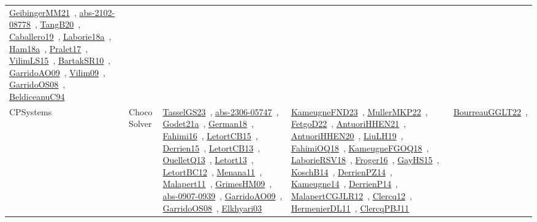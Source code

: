 {\begin{longtable}{lp{3cm}>{\raggedright\arraybackslash}p{6cm}>{\raggedright\arraybackslash}p{6cm}>{\raggedright\arraybackslash}p{8cm}}
\href{works/GeibingerMM21.pdf}{GeibingerMM21}~\cite{GeibingerMM21}, \href{works/abs-2102-08778.pdf}{abs-2102-08778}~\cite{abs-2102-08778}, \href{works/TangB20.pdf}{TangB20}~\cite{TangB20}, \href{works/Caballero19.pdf}{Caballero19}~\cite{Caballero19}, \href{works/Laborie18a.pdf}{Laborie18a}~\cite{Laborie18a}, \href{works/Ham18a.pdf}{Ham18a}~\cite{Ham18a}, \href{works/Pralet17.pdf}{Pralet17}~\cite{Pralet17}, \href{works/VilimLS15.pdf}{VilimLS15}~\cite{VilimLS15}, \href{works/BartakSR10.pdf}{BartakSR10}~\cite{BartakSR10}, \href{works/GarridoAO09.pdf}{GarridoAO09}~\cite{GarridoAO09}, \href{works/Vilim09.pdf}{Vilim09}~\cite{Vilim09}, \href{works/GarridoOS08.pdf}{GarridoOS08}~\cite{GarridoOS08}, \href{works/BeldiceanuC94.pdf}{BeldiceanuC94}~\cite{BeldiceanuC94}\\
CPSystems & Choco Solver & \href{works/TasselGS23.pdf}{TasselGS23}~\cite{TasselGS23}, \href{works/abs-2306-05747.pdf}{abs-2306-05747}~\cite{abs-2306-05747}, \href{works/Godet21a.pdf}{Godet21a}~\cite{Godet21a}, \href{works/German18.pdf}{German18}~\cite{German18}, \href{works/Fahimi16.pdf}{Fahimi16}~\cite{Fahimi16}, \href{works/LetortCB15.pdf}{LetortCB15}~\cite{LetortCB15}, \href{works/Derrien15.pdf}{Derrien15}~\cite{Derrien15}, \href{works/LetortCB13.pdf}{LetortCB13}~\cite{LetortCB13}, \href{works/OuelletQ13.pdf}{OuelletQ13}~\cite{OuelletQ13}, \href{works/Letort13.pdf}{Letort13}~\cite{Letort13}, \href{works/LetortBC12.pdf}{LetortBC12}~\cite{LetortBC12}, \href{works/Menana11.pdf}{Menana11}~\cite{Menana11}, \href{works/Malapert11.pdf}{Malapert11}~\cite{Malapert11}, \href{works/GrimesHM09.pdf}{GrimesHM09}~\cite{GrimesHM09}, \href{works/abs-0907-0939.pdf}{abs-0907-0939}~\cite{abs-0907-0939}, \href{works/GarridoAO09.pdf}{GarridoAO09}~\cite{GarridoAO09}, \href{works/GarridoOS08.pdf}{GarridoOS08}~\cite{GarridoOS08}, \href{works/Elkhyari03.pdf}{Elkhyari03}~\cite{Elkhyari03} & \href{works/KameugneFND23.pdf}{KameugneFND23}~\cite{KameugneFND23}, \href{works/MullerMKP22.pdf}{MullerMKP22}~\cite{MullerMKP22}, \href{works/FetgoD22.pdf}{FetgoD22}~\cite{FetgoD22}, \href{works/AntuoriHHEN21.pdf}{AntuoriHHEN21}~\cite{AntuoriHHEN21}, \href{works/AntuoriHHEN20.pdf}{AntuoriHHEN20}~\cite{AntuoriHHEN20}, \href{works/LiuLH19.pdf}{LiuLH19}~\cite{LiuLH19}, \href{works/FahimiOQ18.pdf}{FahimiOQ18}~\cite{FahimiOQ18}, \href{works/KameugneFGOQ18.pdf}{KameugneFGOQ18}~\cite{KameugneFGOQ18}, \href{works/LaborieRSV18.pdf}{LaborieRSV18}~\cite{LaborieRSV18}, \href{works/Froger16.pdf}{Froger16}~\cite{Froger16}, \href{works/GayHS15.pdf}{GayHS15}~\cite{GayHS15}, \href{works/KoschB14.pdf}{KoschB14}~\cite{KoschB14}, \href{works/DerrienPZ14.pdf}{DerrienPZ14}~\cite{DerrienPZ14}, \href{works/Kameugne14.pdf}{Kameugne14}~\cite{Kameugne14}, \href{works/DerrienP14.pdf}{DerrienP14}~\cite{DerrienP14}, \href{works/MalapertCGJLR12.pdf}{MalapertCGJLR12}~\cite{MalapertCGJLR12}, \href{works/Clercq12.pdf}{Clercq12}~\cite{Clercq12}, \href{works/HermenierDL11.pdf}{HermenierDL11}~\cite{HermenierDL11}, \href{works/ClercqPBJ11.pdf}{ClercqPBJ11}~\cite{ClercqPBJ11} & \href{works/BourreauGGLT22.pdf}{BourreauGGLT22}~\cite{BourreauGGLT22}, 
\end{longtable}}
